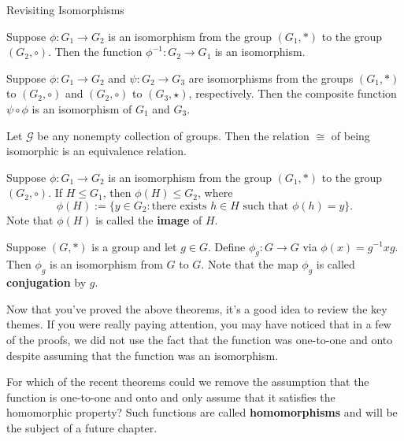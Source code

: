 \begin{section}{Revisiting Isomorphisms}
\begin{theorem}
Suppose \(\phi:G_1\to G_2\) is an isomorphism from the group \((G_1,*)\) to the group \((G_2,\circ)\). Then the function \(\phi^{-1}:G_2\to G_1\) is an isomorphism.
\end{theorem}

\begin{theorem}
Suppose \(\phi:G_1\to G_2\) and \(\psi:G_2\to G_3\) are isomorphisms from the groups \((G_1,*)\) to \((G_2,\circ)\) and \((G_2,\circ)\) to \((G_3,\star)\), respectively. Then the composite function \(\psi\circ\phi\) is an isomorphism of \(G_1\) and \(G_3\).
\end{theorem}

\begin{theorem}
Let \(\mathcal{G}\) be any nonempty collection of groups.  Then the relation \(\cong\) of being isomorphic is an equivalence relation.
\end{theorem}

\begin{theorem}
Suppose \(\phi:G_1\to G_2\) is an isomorphism from the group \((G_1,*)\) to the group \((G_2,\circ)\).  If \(H\leq G_1\), then \(\phi(H)\leq G_2\), where
\[
\phi(H):=\{y\in G_2:\text{there exists } h\in H\text{ such that }\phi(h)=y\}. 
\]
Note that \(\phi(H)\) is called the \textbf{image} of \(H\).
\end{theorem}

\begin{theorem}
Suppose \((G,*)\) is a group and let \(g\in G\).  Define \(\phi_g:G\to G\) via \(\phi(x)=g^{-1}xg\).  Then \(\phi_g\) is an isomorphism from \(G\) to \(G\).  Note that the map \(\phi_g\) is called \textbf{conjugation} by \(g\).
\end{theorem}

Now that you've proved the above theorems, it's a good idea to review the key themes.  If you were really paying attention, you may have noticed that in a few of the proofs, we did not use the fact that the function was one-to-one and onto despite assuming that the function was an isomorphism.

\begin{problem}
For which of the recent theorems could we remove the assumption that the function is one-to-one and onto and only assume that it satisfies the homomorphic property?  Such functions are called \textbf{homomorphisms} and will be the subject of a future chapter.
\end{problem}


\end{section}
